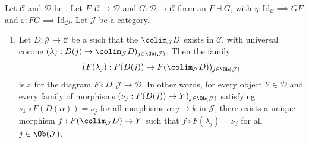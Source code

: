 \begin{theorem}
    \label{theorem:right_left_adjoints_commute_with_limits_colimits}
    Let $\mathcal{C}$ and $\mathcal{D}$ be . Let $F : \mathcal{C} \to \mathcal{D}$ and $G : \mathcal{D} \to \mathcal{C}$ form an  $F \dashv G$, with  $\eta : \mathrm{Id}_{\mathcal{C}} \implies GF$ and  $\varepsilon : FG \implies \mathrm{Id}_{\mathcal{D}}$. Let $\mathcal{J}$ be a category.

    \begin{enumerate}
        \item \label{item:left_adjoint_preserves_colimits} Let $D : \mathcal{J} \to \mathcal{C}$ be a  such that the  $\colim_{\mathcal{J}} D$ exists in $\mathcal{C}$, with universal cocone $(\lambda_j : D(j) \to \colim_{\mathcal{J}} D)_{j \in \Ob(\mathcal{J})}$. Then the family
        $$
        (F(\lambda_j) : F(D(j)) \to F(\colim_{\mathcal{J}} D))_{j \in \Ob(\mathcal{J})}
        $$
        is a  for the diagram $F \circ D : \mathcal{J} \to \mathcal{D}$. In other words, for every object $Y \in \mathcal{D}$ and every family of morphisms $(\nu_j : F(D(j)) \to Y)_{j \in \Ob(\mathcal{J})}$ satisfying $\nu_k \circ F(D(\alpha)) = \nu_j$ for all morphisms $\alpha : j \to k$ in $\mathcal{J}$, there exists a unique morphism $f : F(\colim_{\mathcal{J}} D) \to Y$ such that $f \circ F(\lambda_j) = \nu_j$ for all $j \in \Ob(\mathcal{J})$.


\end{enumerate}
\end{theorem}
